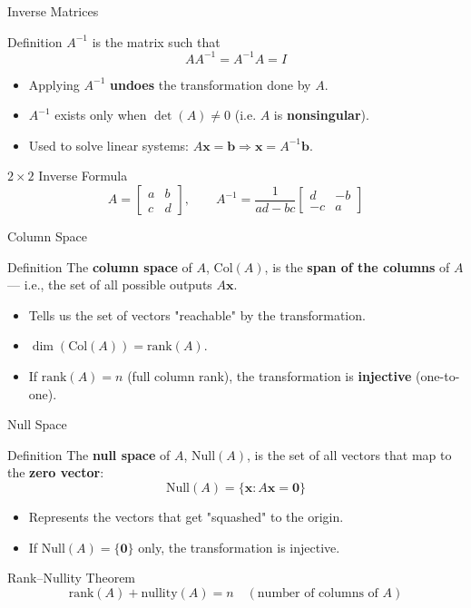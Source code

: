 \documentclass[9pt,aspectratio=169]{beamer}
\newcommand{\vect}[1]{\mathbf{#1}}
\begin{document}
\begin{frame}{Inverse Matrices}
\begin{block}{Definition}
$A^{-1}$ is the matrix such that
$$A A^{-1} = A^{-1}A = I$$
\end{block}
\begin{itemize}
\item Applying $A^{-1}$ \textbf{undoes} the transformation done by $A$.
\item $A^{-1}$ exists only when $\det(A) \neq 0$ (i.e. $A$ is \textbf{nonsingular}).
\item Used to solve linear systems: $A\vect{x}=\vect{b} \Rightarrow \vect{x} = A^{-1}\vect{b}$.
\end{itemize}
\begin{exampleblock}{$2\times 2$ Inverse Formula}
$$A=\begin{bmatrix}a&b\\c&d\end{bmatrix}, \qquad A^{-1} = \frac{1}{ad-bc}\begin{bmatrix}d&-b\\-c&a\end{bmatrix}$$
\end{exampleblock}
\end{frame}

\begin{frame}{Column Space}
\begin{block}{Definition}
The \textbf{column space} of $A$, $\text{Col}(A)$, is the \textbf{span of the columns} of $A$ — i.e., the set of all possible outputs $A\vect{x}$.
\end{block}
\begin{itemize}
\item Tells us the set of vectors "reachable" by the transformation.
\item $\dim(\text{Col}(A)) = \text{rank}(A)$.
\item If $\text{rank}(A) = n$ (full column rank), the transformation is \textbf{injective} (one-to-one).
\end{itemize}
\end{frame}

\begin{frame}{Null Space}
\begin{block}{Definition}
The \textbf{null space} of $A$, $\text{Null}(A)$, is the set of all vectors that map to the \textbf{zero vector}:
$$\text{Null}(A) = \{\vect{x} : A\vect{x} = \vect{0}\}$$
\end{block}
\begin{itemize}
\item Represents the vectors that get "squashed" to the origin.
\item If $\text{Null}(A) = \{\vect{0}\}$ only, the transformation is injective.
\end{itemize}
\begin{block}{Rank–Nullity Theorem}
$$\text{rank}(A) + \text{nullity}(A) = n \quad (\text{number of columns of } A)$$
\end{block}
\end{frame}
\end{document}
